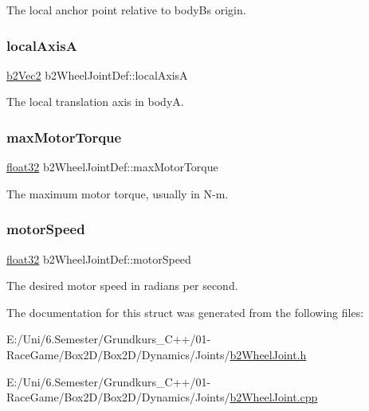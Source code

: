 The local anchor point relative to bodyB\textquotesingle{}s origin. 

\mbox{\label{structb2_wheel_joint_def_ad635ee7b77b50037dc0e021a0f5c93a6}} 
\subsubsection{\texorpdfstring{localAxisA}{localAxisA}}
{\footnotesize\ttfamily \mbox{\hyperlink{structb2_vec2}{b2\+Vec2}} b2\+Wheel\+Joint\+Def\+::local\+AxisA}



The local translation axis in bodyA. 

\mbox{\label{structb2_wheel_joint_def_ab658ce0fae40c6de09133659f7ffb829}} 
\subsubsection{\texorpdfstring{maxMotorTorque}{maxMotorTorque}}
{\footnotesize\ttfamily \mbox{\hyperlink{b2_settings_8h_aacdc525d6f7bddb3ae95d5c311bd06a1}{float32}} b2\+Wheel\+Joint\+Def\+::max\+Motor\+Torque}



The maximum motor torque, usually in N-\/m. 

\mbox{\label{structb2_wheel_joint_def_a7248e25f2ca6b6c2a5f7079ce16e7748}} 
\subsubsection{\texorpdfstring{motorSpeed}{motorSpeed}}
{\footnotesize\ttfamily \mbox{\hyperlink{b2_settings_8h_aacdc525d6f7bddb3ae95d5c311bd06a1}{float32}} b2\+Wheel\+Joint\+Def\+::motor\+Speed}



The desired motor speed in radians per second. 



The documentation for this struct was generated from the following files\+:\begin{DoxyCompactItemize}
\item 
E\+:/\+Uni/6.\+Semester/\+Grundkurs\+\_\+\+C++/01-\/\+Race\+Game/\+Box2\+D/\+Box2\+D/\+Dynamics/\+Joints/\mbox{\hyperlink{b2_wheel_joint_8h}{b2\+Wheel\+Joint.\+h}}\item 
E\+:/\+Uni/6.\+Semester/\+Grundkurs\+\_\+\+C++/01-\/\+Race\+Game/\+Box2\+D/\+Box2\+D/\+Dynamics/\+Joints/\mbox{\hyperlink{b2_wheel_joint_8cpp}{b2\+Wheel\+Joint.\+cpp}}\end{DoxyCompactItemize}
